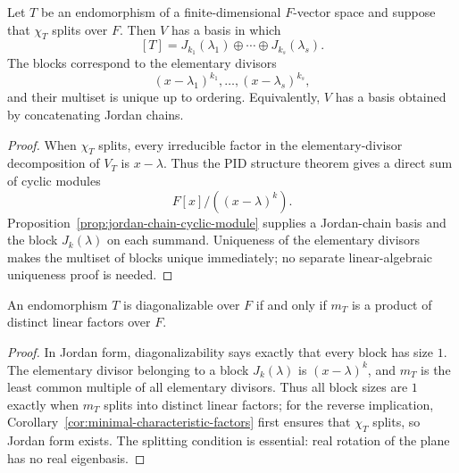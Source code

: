 \begin{theorem}\label{thm:jordan-canonical-form}
Let \(T\) be an endomorphism of a finite-dimensional \(F\)-vector space and
suppose that \(\chi_T\) splits over \(F\).  Then \(V\) has a basis in which
\[
[T]=J_{k_1}(\lambda_1)\oplus\cdots\oplus J_{k_s}(\lambda_s).
\]
The blocks correspond to the elementary divisors
\[
(x-\lambda_1)^{k_1},\ldots,(x-\lambda_s)^{k_s},
\]
and their multiset is unique up to ordering.  Equivalently, \(V\) has a
basis obtained by concatenating Jordan chains.
\end{theorem}
\begin{proof}
When \(\chi_T\) splits, every irreducible factor in the elementary-divisor
decomposition of \(V_T\) is \(x-\lambda\).  Thus the PID structure theorem
gives a direct sum of cyclic modules
\[
F[x]/((x-\lambda)^k).
\]
Proposition~\ref{prop:jordan-chain-cyclic-module} supplies a Jordan-chain
basis and the block \(J_k(\lambda)\) on each summand.  Uniqueness of the
elementary divisors makes the multiset of blocks unique immediately; no
separate linear-algebraic uniqueness proof is needed.
\end{proof}

\begin{corollary}
\label{cor:diagonalizable-minimal-polynomial}
An endomorphism \(T\) is diagonalizable over \(F\) if and only if \(m_T\) is
a product of distinct linear factors over \(F\).
\end{corollary}
\begin{proof}
In Jordan form, diagonalizability says exactly that every block has size
\(1\). The elementary divisor belonging to a block \(J_k(\lambda)\) is
\((x-\lambda)^k\), and \(m_T\) is the least common multiple of all elementary
divisors. Thus all block sizes are \(1\) exactly when \(m_T\) splits into
distinct linear factors; for the reverse implication,
Corollary~\ref{cor:minimal-characteristic-factors} first ensures that
\(\chi_T\) splits, so Jordan form exists. The splitting condition is
essential: real rotation
of the plane has no real eigenbasis.
\end{proof}

